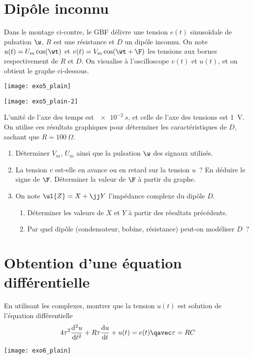 \documentclass[a4paper, 12pt, final, garamond]{book}
\begin{document}
\section{Dipôle inconnu}

\begin{minipage}{0.60\linewidth}
	Dans le montage ci-contre, le GBF délivre une tension $e(t)$ sinusoïdale de
	pulsation $\w$, $R$ est une résistance et $D$ un dipôle inconnu. On note
	$u(t) = U_m\cos(\wt)$ et $v(t) = V_m\cos(\wt+\F)$ les tensions aux bornes
	respectivement de $R$ et $D$. On visualise à l'oscilloscope $v(t)$ et
	$u(t)$, et on obtient le graphe ci-dessous.
\end{minipage}
\begin{minipage}{0.35\linewidth}
	\begin{center}
		\texttt{[image: exo5\_plain]}
	\end{center}
\end{minipage}

\begin{center}
	\texttt{[image: exo5\_plain-2]}
\end{center}

L'unité de l'axe des temps est $\SI{e-2}{s}$, et celle de l'axe des tensions est
\SI{1}{V}. On utilise ces résultats graphiques pour déterminer les
caractéristiques de $D$, sachant que $R = \SI{100}{\Omega}$.

\begin{enumerate}
	\item Déterminer $V_m$, $U_m$ ainsi que la pulsation $\w$ des signaux
	      utilisés.
	\item La tension $v$ est-elle en avance ou en retard sur la tension $u$~? En
	      déduire le signe de $\F$. Déterminer la valeur de $\F$ à partir du
	      graphe.
	\item On note $\ul{Z} = X + \jj Y$ l'impédance complexe du dipôle $D$.
	      \begin{enumerate}
		      \item Déterminer les valeurs de $X$ et $Y$ à partir des résultats
		            précédents.
		      \item Par quel dipôle (condensateur, bobine, résistance) peut-on
		            modéliser $D$~?
	      \end{enumerate}
\end{enumerate}

\section{Obtention d'une équation différentielle}
\begin{minipage}{0.60\linewidth}
	En utilisant les complexes, montrer que la tension $u(t)$ est solution de
	l'équation différentielle
	\[4\tau^2 \dv[2]{u}{t} + R\tau \dv{u}{t} + u(t) = e(t)
		\qavec
		\tau = RC
	\]
\end{minipage}
\hfill
\begin{minipage}{0.35\linewidth}
	\begin{center}
		\texttt{[image: exo6\_plain]}
	\end{center}
\end{minipage}
\end{document}
